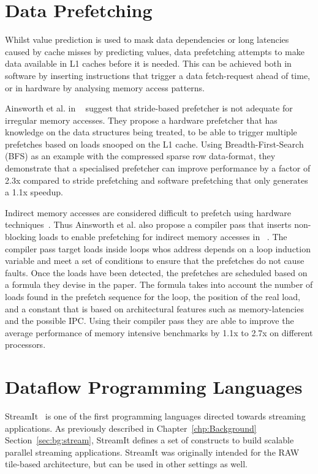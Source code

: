\section{Data Prefetching}
Whilst value prediction is used to mask data dependencies or long latencies caused by cache misses by predicting values, data prefetching attempts to make data available in L1 caches before it is needed.
This can be achieved both in software by inserting instructions that trigger a data fetch-request ahead of time, or in hardware by analysing memory access patterns.

Ainsworth et al. in ~\cite{graphPrefetch2016} suggest that stride-based prefetcher is not adequate for irregular memory accesses.
They propose a hardware prefetcher that has knowledge on the data structures being treated, to be able to trigger multiple prefetches based on loads snooped on the L1 cache.
Using Breadth-First-Search (BFS) as an example with the compressed sparse row data-format, they demonstrate that a specialised prefetcher can improve performance by a factor of 2.3x compared to stride prefetching and software prefetching that only generates a 1.1x speedup.

Indirect memory accesses are considered difficult to prefetch using hardware techniques~\cite{lee2012whenprefetchworks,prefetchForIndirect2017}.
Thus Ainsworth et al. also propose a compiler pass that inserts non-blocking loads to enable prefetching for indirect memory accesses in ~\cite{prefetchForIndirect2017}.
The compiler pass target loads inside loops whos address depends on a loop induction variable and meet a set of conditions to ensure that the prefetches do not cause faults.
Once the loads have been detected, the prefetches are scheduled based on a formula they devise in the paper.
The formula takes into account the number of loads found in the prefetch sequence for the loop, the position of the real load, and a constant that is based on architectural features such as memory-latencies and the possible IPC.
Using their compiler pass they are able to improve the average performance of memory intensive benchmarks by 1.1x to 2.7x on different processors.

\section{Dataflow Programming Languages}

StreamIt~\cite{theis2002streamit} is one of the first programming languages directed towards streaming applications.
As previously described in Chapter~\ref{chp:Background} Section~\ref{sec:bg:stream}, StreamIt defines a set of constructs to build scalable parallel streaming applications.
StreamIt was originally intended for the RAW ~\cite{waingold1997raw} tile-based architecture, but can be used in other settings as well.

